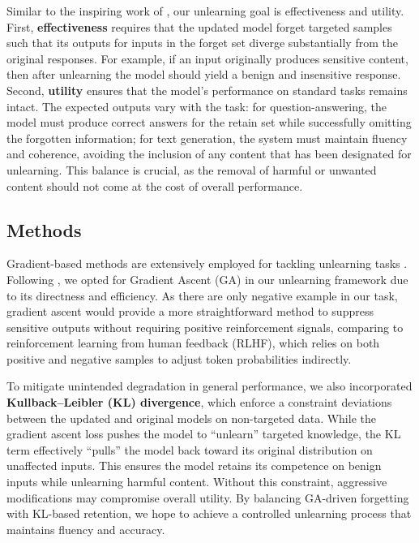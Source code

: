 \documentclass[11pt]{article}
\begin{document}
Similar to the inspiring work of \citet{yao2023}, our unlearning goal is effectiveness and utility. First, \textbf{effectiveness} requires that the updated model forget targeted samples such that its outputs for inputs in the forget set diverge substantially from the original responses. For example, if an input originally produces sensitive content, then after unlearning the model should yield a benign and insensitive response. Second, \textbf{utility} ensures that the model’s performance on standard tasks remains intact. The expected outputs vary with the task: for question-answering, the model must produce correct answers for the retain set while successfully omitting the forgotten information; for text generation, the system must maintain fluency and coherence, avoiding the inclusion of any content that has been designated for unlearning. This balance is crucial, as the removal of harmful or unwanted content should not come at the cost of overall performance.

\subsection*{Methods}

Gradient-based methods are extensively employed for tackling unlearning tasks \cite{guo2019certified, maini2024tofu, neel2021descent, trippa2024tau}. Following \citet{yao2023}, we opted for Gradient Ascent (GA) in our unlearning framework due to its directness and efficiency. As there are only negative example in our task, gradient ascent would provide a more straightforward method to suppress sensitive outputs without requiring positive reinforcement signals, comparing to reinforcement learning from human feedback (RLHF), which relies on both positive and negative samples to adjust token probabilities indirectly. 

To mitigate unintended degradation in general performance, we also incorporated \textbf{Kullback--Leibler (KL) divergence}, which enforce a constraint deviations between the updated and original models on non-targeted data. While the gradient ascent loss pushes the model to “unlearn” targeted knowledge, the KL term effectively “pulls” the model back toward its original distribution on unaffected inputs. This ensures the model retains its competence on benign inputs while unlearning harmful content. Without this constraint, aggressive modifications may compromise overall utility. By balancing GA-driven forgetting with KL-based retention, we hope to achieve a controlled unlearning process that maintains fluency and accuracy.
\end{document}
